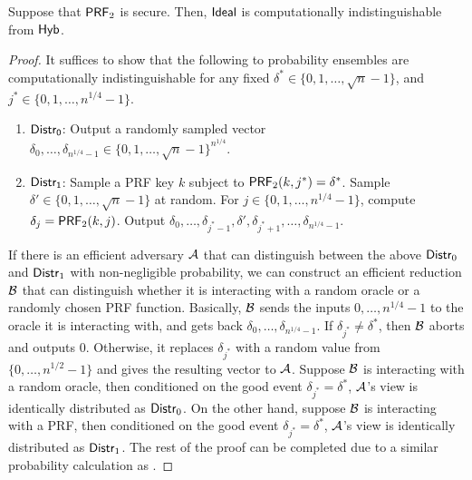 \begin{lemma}
Suppose that $\mathsf{PRF}_2$
is secure. Then, ${\sf Ideal}$ is computationally
indistinguishable from ${\sf Hyb}$.
\label{lem:privateprog2}
\end{lemma}
\begin{proof}
It suffices to show that the following to probability ensembles are
computationally indistinguishable
for any fixed $\delta^* \in \{0, 1, \ldots, \sqrt{n}-1\}$,
and $j^* \in \{0, 1, \ldots, n^{1/4} -1\}$.
\begin{enumerate}[leftmargin=5mm]
\item 
${\sf Distr_0}$:
Output a randomly sampled vector 
$\delta_0, \ldots, \delta_{n^{1/4}-1} 
\in \{0, 1, \ldots, \sqrt{n}-1\}^{n^{1/4}}$.
\item  
${\sf Distr_1}$:
Sample a PRF key $k$ subject to 
$\mathsf{PRF}_2(k, j^*) = \delta^*$.  
Sample $\delta' \in \{0, 1, \ldots, \sqrt{n}-1\}$ at random. 
For $j \in \{0, 1, \ldots, n^{1/4}-1\}$, 
compute $\delta_j = \mathsf{PRF}_2(k, j)$.
Output 
$\delta_0, \ldots, \delta_{j^*-1}, \delta', 
\delta_{j^*+1}, \ldots, \delta_{n^{1/4}-1}$.
\end{enumerate}

If there is an efficient adversary $\mathcal{A}$ that can distinguish
between the above 
${\sf Distr}_0$ 
and  
${\sf Distr}_1$ 
with non-negligible probability, we can construct an efficient 
reduction $\mathcal{B}$
that can distinguish
whether it is interacting with a random oracle 
or a randomly chosen PRF function.
Basically, $\mathcal{B}$ 
sends the inputs $0, \ldots, n^{1/4}-1$ to the oracle 
it is interacting with, and gets back
$\delta_0, \ldots, \delta_{n^{1/4}-1}$.
If $\delta_{j^*} \neq \delta^*$, 
then $\mathcal{B}$ aborts and outputs $0$. 
Otherwise, it 
replaces $\delta_{j^*}$ with a random value
from $\{0, \ldots, n^{1/2}-1\}$
and gives the resulting vector to $\mathcal{A}$.
Suppose $\mathcal{B}$ is interacting with a random oracle,
then conditioned on the good event 
$\delta_{j^*} = \delta^*$, $\mathcal{A}$'s view
is identically distributed as ${\sf Distr}_0$.
On the other hand, suppose $\mathcal{B}$ is interacting with a PRF,
then conditioned on the good event 
$\delta_{j^*} = \delta^*$, $\mathcal{A}$'s view
is identically distributed as ${\sf Distr}_1$.
The rest of the proof can be completed due
to a similar probability calculation as 
.
\end{proof}





